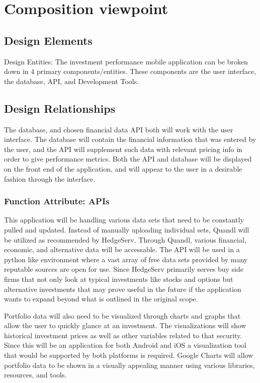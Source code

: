 \documentclass[onecolumn, draftclsnofoot,10pt, compsoc]{IEEEtran}
\begin{document}
\section{Composition viewpoint}
\subsection{Design Elements}
        Design Entities: The investment performance mobile application can be broken down in 4 primary components/entities. These components are the user interface, the database, API, and Development Tools.

\subsection{Design Relationships}
        The database, and chosen financial data API both will work with the user interface. The database will contain the financial information that was entered by the user, and the API will
        supplement such data with relevant pricing info in order to give performance metrics. Both the API and database will be displayed on the front end of the application, and will appear
        to the user in a desirable fashion through the interface.

\subsubsection{Function Attribute: APIs}
        This application will be handling various data sets that need to be constantly pulled and updated. Instead of manually uploading individual sets, Quandl will be utilized as recommended by HedgeServ. Through Quandl,
	various financial, economic, and alternative data will be accessable. The API will be used in a python like environment where a vast array of free data sets provided by many reputable sources are open for use.
	Since HedgeServ primarily serves buy side firms that not only look at typical investments like stocks and options but alternative investments that may prove useful in the future if the application wants to expand
	beyond what is outlined in the original scope. 
        
        Portfolio data will also need to be visualized through charts and graphs that allow the user to quickly glance at an investment. The visualizations will show historical investment prices as well as other
	variables related to that security. Since this will be an application for both Android and iOS a visualization tool that would be supported by both platforms is required. Google Charts will allow portfolio data to
	be shown in a visually appealing manner using various libraries, resources, and tools. 
        
\end{document}

